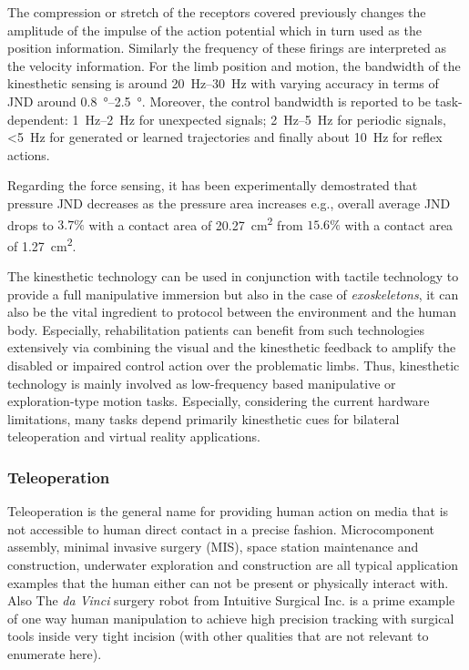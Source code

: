 The compression or stretch of the receptors covered previously changes the amplitude of the impulse of the action potential which in turn used as the position information. Similarly the frequency of these firings are interpreted as the velocity information. For the limb position and motion, the bandwidth of the kinesthetic sensing is around \SIrange{20}{30}{\hertz} with varying accuracy in terms of JND around \SIrange{0.8}{2.5}{\degree}. Moreover, the control bandwidth is reported to be task-dependent: \SIrange{1}{2}{\hertz} for unexpected signals; \SIrange{2}{5}{\hertz} for periodic signals, \SI[parse-numbers=false]{<5}{\hertz} for generated or learned trajectories and finally about \SI{10}{\hertz} for reflex actions. 

Regarding the force sensing, it has been experimentally demostrated that pressure JND decreases as the pressure area increases e.g., overall average JND drops to $3.7\%$ with a contact area of \SI{20.27}{\centi\meter\squared} from $15.6\%$ with a contact area of \SI{1.27}{\centi\meter\squared}. 

The kinesthetic technology can be used in conjunction with tactile technology to provide a full manipulative immersion but also in the case of \emph{exoskeletons}, it can also be the vital ingredient to protocol between the environment and the human body. Especially, rehabilitation patients can benefit from such technologies extensively via combining the visual and the kinesthetic feedback to amplify the disabled or impaired control action over the problematic limbs. Thus, kinesthetic technology is mainly involved as low-frequency based manipulative or exploration-type motion tasks. Especially, considering the current hardware limitations, many tasks depend primarily kinesthetic cues for bilateral teleoperation and virtual reality applications.


\subsubsection{Teleoperation}
Teleoperation is the general name for providing human action on media that is not accessible to human direct contact in a precise fashion. Microcomponent assembly, minimal invasive surgery (MIS), space station maintenance and construction, underwater exploration and construction are all typical application examples that the human either can not be present or physically interact with. Also The \emph{da Vinci}\raisebox{0.5ex}{\scriptsize\texttrademark} surgery robot from Intuitive Surgical Inc. is a prime example of one way human manipulation to achieve high precision tracking with surgical tools inside very tight incision (with other qualities that are not relevant to enumerate here). 

